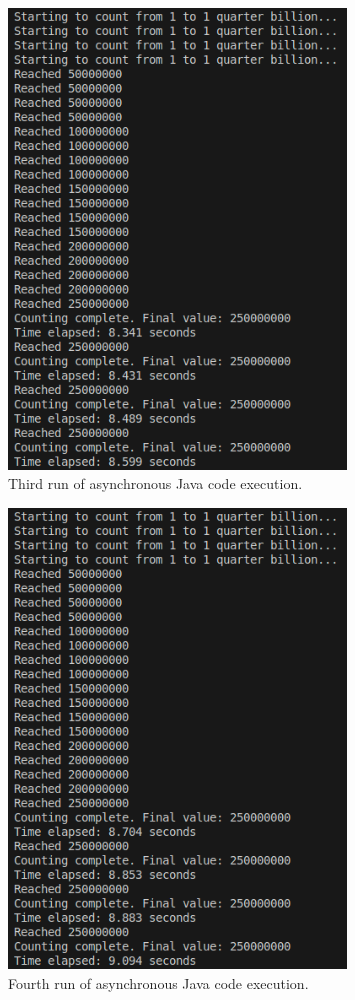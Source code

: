 \documentclass[12pt,a4paper]{article}
\begin{document}
\begin{figure}[htbp]
    \centering
    \includegraphics[width=0.8\textwidth]{../async_records/results_java/result_3.png}
    \caption{Third run of asynchronous Java code execution.}
    \label{fig:Java-async-runtime-3}
\end{figure}

\begin{figure}[htbp]
    \centering
    \includegraphics[width=0.8\textwidth]{../async_records/results_java/result_4.png}
    \caption{Fourth run of asynchronous Java code execution.}
    \label{fig:Java-async-runtime-4}
\end{figure}
\end{document}
